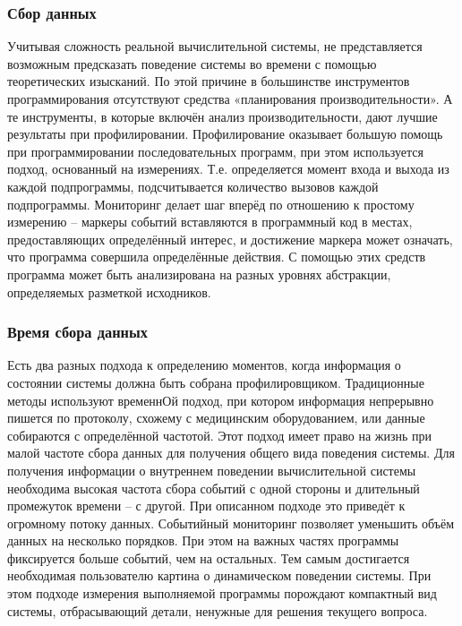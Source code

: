 \subsubsection{Сбор данных}
Учитывая сложность реальной вычислительной системы, не представляется возможным предсказать поведение системы во времени с помощью теоретических изысканий. По этой причине в большинстве инструментов программирования отсутствуют средства «планирования производительности». А те инструменты, в которые включён анализ производительности, дают лучшие результаты при профилировании. Профилирование оказывает большую помощь при программировании последовательных программ, при этом используется подход, основанный на измерениях. Т.е. определяется момент входа и выхода из каждой подпрограммы, подсчитывается количество вызовов каждой подпрограммы. Мониторинг делает шаг вперёд по отношению к простому измерению – маркеры событий вставляются в программный код в местах, предоставляющих определённый интерес, и достижение маркера может означать, что программа совершила определённые действия. С помощью этих средств программа может быть анализирована на разных уровнях абстракции, определяемых разметкой исходников.
\subsubsection{Время сбора данных}
Есть два разных подхода к определению моментов, когда информация о состоянии системы должна быть собрана профилировщиком. Традиционные методы используют временнОй подход, при котором информация непрерывно пишется по протоколу, схожему с медицинским оборудованием, или данные собираются с определённой частотой. Этот подход имеет право на жизнь при малой частоте сбора данных для получения общего вида поведения системы. Для получения информации о внутреннем поведении вычислительной системы необходима высокая частота сбора событий с одной стороны и длительный промежуток времени – с другой. При описанном подходе это приведёт к огромному потоку данных.
Событийный мониторинг позволяет уменьшить объём данных на несколько порядков. При этом на важных частях программы фиксируется больше событий, чем на остальных. Тем самым достигается необходимая пользователю картина о динамическом поведении системы. При этом подходе измерения выполняемой программы порождают компактный вид системы, отбрасывающий детали, ненужные для решения текущего вопроса.
